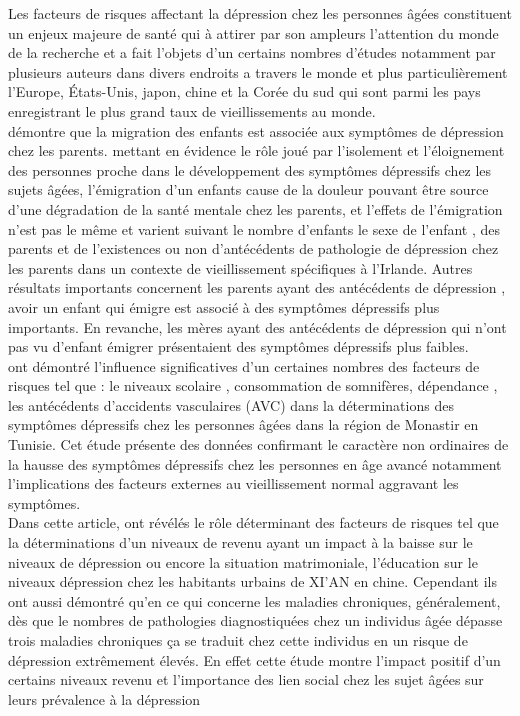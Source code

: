 \documentclass[a4paper]{article}
\begin{document}
	Les facteurs de risques affectant la dépression chez les personnes âgées constituent un enjeux majeure de santé qui à attirer par son ampleurs l’attention du monde de la recherche et a fait l’objets d’un certains nombres d’études notamment par plusieurs auteurs dans divers endroits a travers le monde et plus particulièrement  l’Europe, États-Unis, japon, chine et la Corée du sud qui sont parmi les pays enregistrant le plus grand taux de vieillissements au monde.\\
	\citep{Mosca2016} démontre que la migration des enfants est associée aux symptômes de dépression chez les parents. mettant en évidence le rôle joué par l’isolement et l'éloignement  des personnes  proche dans le développement des symptômes dépressifs chez les sujets âgées, l’émigration d’un enfants cause de la douleur pouvant être source d’une dégradation de la santé mentale chez les parents, et l’effets de l’émigration n’est pas le même et varient suivant le nombre d’enfants le sexe de l’enfant , des parents et de l’existences ou non d’antécédents de pathologie de dépression chez les parents dans un contexte de vieillissement spécifiques à l’Irlande. Autres résultats importants concernent les parents ayant  des antécédents de dépression , avoir un enfant qui émigre est associé à des symptômes dépressifs plus importants. En revanche, les mères ayant des antécédents de dépression qui n’ont pas vu d’enfant émigrer présentaient des symptômes dépressifs plus faibles.\\
	 \citep{Hammami2012} ont démontré l’influence significatives d’un certaines nombres des facteurs de risques tel  que : le niveaux scolaire , consommation de somnifères, dépendance , les antécédents d’accidents vasculaires (AVC) dans la déterminations  des symptômes dépressifs chez les personnes âgées dans la région de Monastir en Tunisie. Cet étude présente des données confirmant le caractère non ordinaires de la hausse  des symptômes dépressifs chez les personnes en âge avancé notamment l’implications des facteurs externes au vieillissement normal aggravant les symptômes.\\
	Dans cette article, \cite{Yunming2012} ont révélés le rôle déterminant des facteurs de risques tel que la déterminations d’un niveaux de revenu ayant un impact à la baisse sur le niveaux de dépression ou encore la situation matrimoniale, l'éducation sur le niveaux dépression chez les habitants urbains  de XI’AN en chine. Cependant  ils ont aussi démontré qu'en ce qui concerne les maladies chroniques, généralement, dès que le nombres de pathologies diagnostiquées chez un individus âgée dépasse trois maladies chroniques ça se traduit chez cette individus en un risque de dépression extrêmement élevés. En effet cette étude montre l’impact positif d’un certains niveaux  revenu et l’importance des lien social chez les sujet âgées sur leurs prévalence à la dépression 
\end{document}
